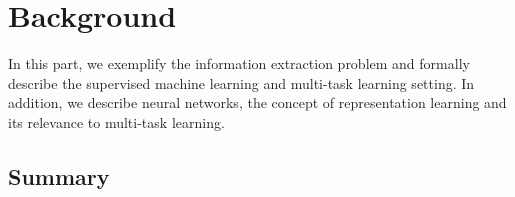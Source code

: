 \chapter{Background}
\label{background}

In this part, we exemplify the information extraction problem and formally describe the supervised machine learning and multi-task learning setting. In addition, we describe neural networks, the concept of representation learning and its relevance to multi-task learning.







\section{Summary}
